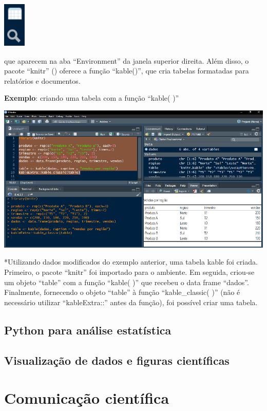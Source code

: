 \documentclass[
]{book}
\begin{document}
\includegraphics{images/clipboard-4018646742.png}

que aparecem na aba ``Environment'' da janela superior direita. Além disso, o pacote ``knitr'' (\citeproc{ref-xieaut2024}{Xie {[}aut et al. 2024}) oferece a função ``kable()'', que cria tabelas formatadas para relatórios e documentos.

\textbf{Exemplo}: criando uma tabela com a função ``kable( )''

\includegraphics{images/clipboard-2208731083.png}

*Utilizando dados modificados do exemplo anterior, uma tabela kable foi criada. Primeiro, o pacote ``knitr'' foi importado para o ambiente. Em seguida, criou-se um objeto ``table'' com a função ``kable( )'' que recebeu o data frame ``dados''. Finalmente, fornecendo o objeto ``table'' à função ``kable\_classic( )'' (não é necessário utilizar ``kableExtra::'' antes da função), foi possível criar uma tabela.

\section{Python para análise estatística}\label{python-para-anuxe1lise-estatuxedstica}

\section{Visualização de dados e figuras científicas}\label{visualizauxe7uxe3o-de-dados-e-figuras-cientuxedficas}

\chapter{Comunicação científica}\label{comunicauxe7uxe3o-cientuxedfica}
\end{document}

